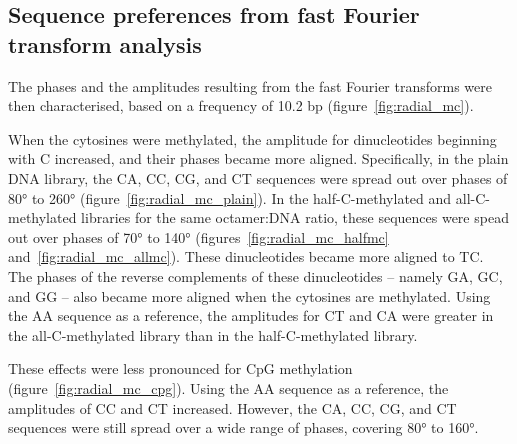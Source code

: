 \documentclass[parskip=full, numbers=noenddot]{scrreprt}
\begin{document}
\subsection{Sequence preferences from fast Fourier transform analysis}
\label{ssec:nuseqpref_fft}

The phases and the amplitudes resulting from the fast Fourier transforms were then characterised, based on a frequency of 10.2 bp (figure~\ref{fig:radial_mc}).

When the cytosines were methylated, the amplitude for dinucleotides beginning with C increased, and their phases became more aligned.  Specifically, in the plain DNA library, the CA, CC, CG, and CT sequences were spread out over phases of \ang{80} to \ang{260} (figure~\ref{fig:radial_mc_plain}).  In the half-C-methylated and all-C-methylated libraries for the same octamer:DNA ratio, these sequences were spead out over phases of \ang{70} to \ang{140} (figures~\ref{fig:radial_mc_halfmc} and~\ref{fig:radial_mc_allmc}).  These dinucleotides became more aligned to TC.  The phases of the reverse complements of these dinucleotides -- namely GA, GC, and GG -- also became more aligned when the cytosines are methylated.   Using the AA sequence as a reference, the amplitudes for CT and CA were greater in the all-C-methylated library than in the half-C-methylated library.

These effects were less pronounced for CpG methylation (figure~\ref{fig:radial_mc_cpg}).  Using the AA sequence as a reference, the amplitudes of CC and CT increased.  However, the CA, CC, CG, and CT sequences were still spread over a wide range of phases, covering \ang{80} to \ang{160}.
\end{document}
